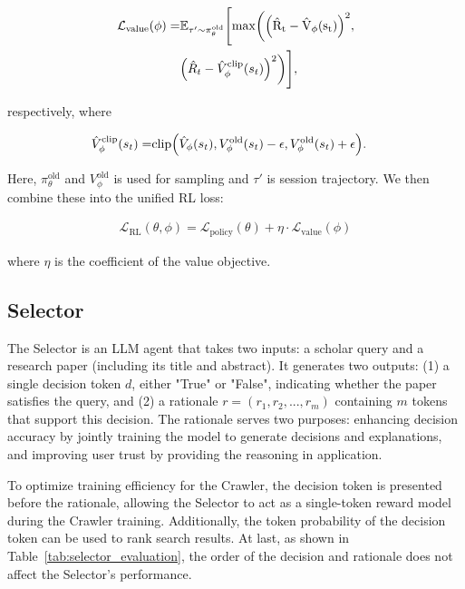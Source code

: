 \begin{small}
\begin{eqnarray}\label{value_loss}
\mathcal{L}_{\text{value}}(\phi)=&\mathbb{E}_{\tau'\sim\pi_{\theta}^\text{old}}\Bigg[\rm{max}\bigg(\Big(\hat{R}_t-\hat{V}_\phi(s_t)\Big)^2,\\\nonumber
&\Big(\hat{R}_t-\hat{V}_{\phi}^{\rm{clip}}(s_t)\Big)^2\bigg)\Bigg],
\end{eqnarray}
\end{small}
respectively, where
\begin{small}
\begin{eqnarray}
    \hat{V}_{\phi}^{\rm{clip}}(s_t)=&\text{clip}\Big(\hat{V}_{\phi}(s_t),V_{\phi}^{\text{old}}(s_t)-\epsilon,V_{\phi}^{\text{old}}(s_t)+\epsilon\Big).
\end{eqnarray}
\end{small}
Here, $\pi_{\theta}^\text{old}$ and $V_{\phi}^{\text{old}}$ is used for sampling and $\tau'$ is session trajectory. We then combine these into the unified RL loss:

\begin{small}
\begin{eqnarray}\label{rl_loss}
\mathcal{L}_{\text{RL}}(\theta, \phi)=\mathcal{L}_{\text{policy}}(\theta)+\eta\cdot\mathcal{L}_{\text{value}}(\phi)
\end{eqnarray}
\end{small}
where $\eta$ is the coefficient of the value objective. 

\subsection{Selector}

The Selector is an LLM agent that takes two inputs: a scholar query and a research paper (including its title and abstract). It generates two outputs: (1) a single decision token $d$, either "True" or "False", indicating whether the paper satisfies the query, and (2) a rationale $r=(r_1, r_2, ..., r_{m})$ containing $m$ tokens that support this decision. The rationale serves two purposes: enhancing decision accuracy by jointly training the model to generate decisions and explanations, and improving user trust by providing the reasoning in \pasa application. 

To optimize training efficiency for the Crawler, the decision token is presented before the rationale, allowing the Selector to act as a single-token reward model during the Crawler training. Additionally, the token probability of the decision token can be used to rank search results. At last, as shown in Table~\ref{tab:selector_evaluation}, the order of the decision and rationale does not affect the Selector's performance.

